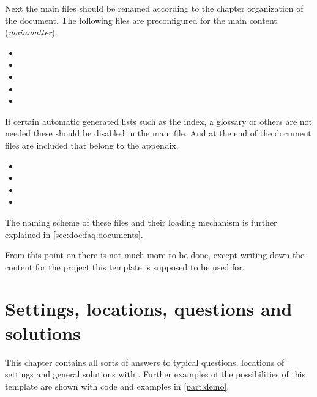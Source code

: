 Next the main files should be renamed according to the chapter organization of the document. The following files are preconfigured for the main content (\emph{mainmatter}). 
%
\begin{itemize}
\item {}
\item {}
\item {}
\item {}
\item {}
\end{itemize}
%
If certain automatic generated lists such as the index, a glossary or others are not needed these should be disabled in the main file.
%
%
And at the end of the document files are included that belong to the appendix. %
\begin{itemize}
\item {}
\item {}
\item {}
\item {}
\end{itemize}
%
The naming scheme of these files and their loading mechanism is further explained in \cref{sec:doc:faq:documents}.

From this point on there is not much more to be done, except writing down the content for the project this template is supposed to be used for.



\chapter{Settings, locations, questions and solutions}
\label{chap:doc:faq}
This chapter contains all sorts of answers to typical questions, locations of settings and general solutions with \latex. Further examples of the possibilities of this template are shown with code and examples in \cref{part:demo}.


